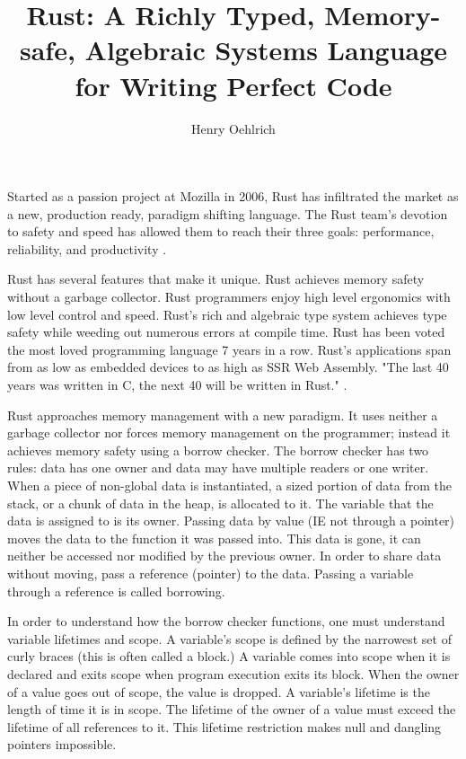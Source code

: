 \documentclass[12pt]{article}
\author{Henry Oehlrich}
\title{Rust: A Richly Typed, Memory-safe, Algebraic Systems Language for Writing Perfect Code}
\begin{document}
\makeheader{}
\thispagestyle{empty}
\setlength{\parindent}{20pt}
Started as a passion project at Mozilla in 2006, Rust has infiltrated the
market as a new, production ready, paradigm shifting language. The Rust team's
devotion to safety and speed has allowed them to reach their three goals:
performance, reliability, and productivity \textit{\cite{rust-lang.org}}.

Rust has several features that make it unique. Rust achieves memory safety
without a garbage collector. Rust programmers enjoy high level ergonomics with
low level control and speed. Rust's rich and algebraic type system achieves
type safety while weeding out numerous errors at compile time. Rust has been
voted the most loved programming language 7 years in a row.
\textit{\cite{so-dev-survey}} Rust's applications span from as low as embedded
devices to as high as SSR Web Assembly. "The last 40 years was written in C,
the next 40 will be written in Rust." \textit{\cite{noboilerplate}}.


Rust approaches memory management with a new paradigm. It uses neither a
garbage collector nor forces memory management on the programmer; instead it
achieves memory safety using a borrow checker. The borrow checker has two
rules: data has one owner and data may have multiple readers or one writer.
When a piece of non-global data is instantiated, a sized portion of data from
the stack, or a chunk of data in the heap, is allocated to it. The variable
that the data is assigned to is its owner. Passing data by value (IE not
through a pointer) moves the data to the function it was passed into. This data
is gone, it can neither be accessed nor modified by the previous owner. In
order to share data without moving, pass a reference (pointer) to the data.
Passing a variable through a reference is called borrowing. 

In order to understand how the borrow checker functions, one must understand
variable lifetimes and scope.  A variable's scope is defined by the narrowest
set of curly braces (this is often called a block.) A variable comes into scope
when it is declared and exits scope when program execution exits its block.
When the owner of a value goes out of scope, the value is dropped. A variable's
lifetime is the length of time it is in scope. The lifetime of the owner of a
value must exceed the lifetime of all references to it. This lifetime
restriction makes null and dangling pointers impossible.
\end{document}
